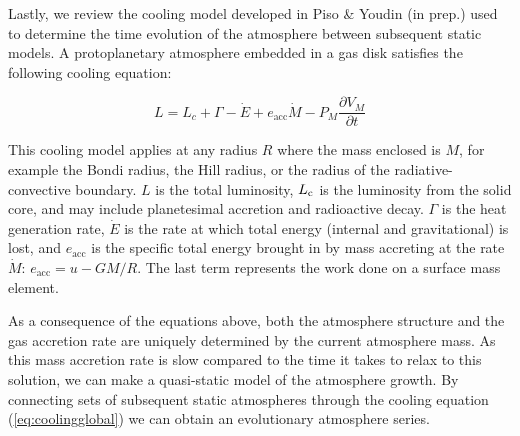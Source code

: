 \documentclass[apj]{emulateapj}
\begin{document}
Lastly, we review the cooling model developed in Piso \& Youdin (in prep.) used to determine the time evolution of the atmosphere between subsequent static models. A protoplanetary atmosphere embedded in a gas disk satisfies the following cooling equation:

\begin{equation}
\label{eq:coolingglobal}
L=L_c+\Gamma-\dot{E}+e_{\mathrm{acc}}\dot{M}-P_M \frac{\partial V_M}{\partial t}
\end{equation}

This cooling model applies at any radius $R$ where the mass enclosed is $M$, for example the Bondi radius, the Hill radius, or the radius of the radiative-convective boundary. $L$ is the total luminosity, $L_{\rm c}$ is the luminosity from the solid core, and may include planetesimal accretion and radioactive decay. $\Gamma$ is the heat generation rate, $\dot{E}$ is the rate at which total energy (internal and gravitational) is lost, and  $e_{\mathrm{acc}}$ is the specific total energy brought in by mass accreting at the rate $\dot{M}$: $e_{\mathrm{acc}}=u-G M/R$. The last term represents the work done on a surface mass element. 


As a consequence of the equations above, both the atmosphere structure and the gas accretion rate are uniquely determined by the current atmosphere mass. As this mass accretion rate is slow compared to the time it takes to relax to this solution, we can make a quasi-static model of the atmosphere growth. By connecting sets of subsequent static atmospheres through the cooling equation (\ref{eq:coolingglobal}) we can obtain an evolutionary atmosphere series. 
\end{document}

